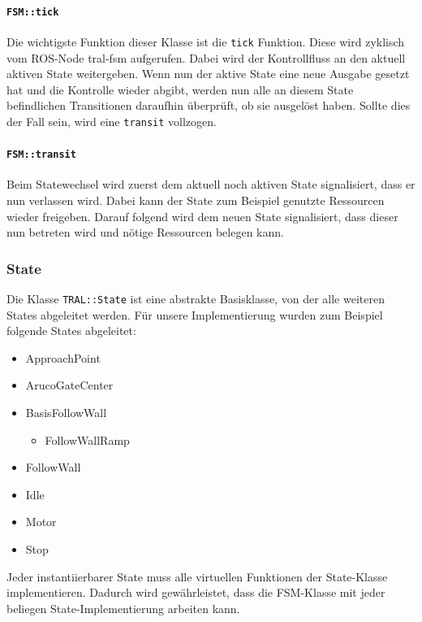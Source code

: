 \paragraph{\texttt{FSM::tick}}

Die wichtigste Funktion dieser Klasse ist die \texttt{tick} Funktion. Diese wird zyklisch vom ROS-Node tral-fsm aufgerufen. Dabei wird der Kontrollfluss an den aktuell aktiven State weitergeben. Wenn nun der aktive State eine neue Ausgabe gesetzt hat und die Kontrolle wieder abgibt, werden nun alle an diesem State befindlichen Transitionen daraufhin überprüft, ob sie ausgelöst haben. Sollte dies der Fall sein, wird eine \texttt{transit} vollzogen.

\paragraph{\texttt{FSM::transit}}

Beim Statewechsel wird zuerst dem aktuell noch aktiven State signalisiert, dass er nun verlassen wird. Dabei kann der State zum Beispiel genutzte Ressourcen wieder freigeben. Darauf folgend wird dem neuen State signalisiert, dass dieser nun betreten wird und nötige Ressourcen belegen kann.


\subsubsection{State}
Die Klasse \texttt{TRAL::State} ist eine abstrakte Basisklasse, von der alle weiteren States abgeleitet werden. Für unsere Implementierung wurden zum Beispiel folgende States abgeleitet:

\begin{itemize}
	\item ApproachPoint
	\item ArucoGateCenter
	\item BasisFollowWall
	\begin{itemize}
		\item FollowWallRamp
	\end{itemize}
	\item FollowWall
	\item Idle
	\item Motor
	\item Stop
\end{itemize}

Jeder instantiierbarer State muss alle virtuellen Funktionen der State-Klasse implementieren. Dadurch wird gewährleistet, dass die FSM-Klasse mit jeder beliegen State-Implementierung arbeiten kann.

